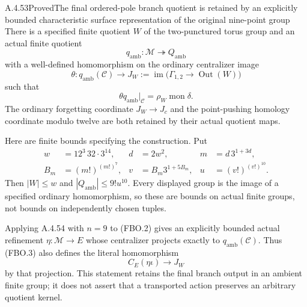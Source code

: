 \begin{result}{A.4.53}{Proved}{The final ordered-pole branch quotient is retained by an explicitly bounded characteristic surface representation of the original nine-point group}
There is a specified finite quotient $W$ of the two-punctured
torus group and an actual finite quotient
\[
 q_{\mathrm{amb}}:\mathcal M\twoheadrightarrow Q_{\mathrm{amb}}
                                                               \tag{FBO.2}
\]
with a well-defined homomorphism on the ordinary centralizer image
\[
 \theta:q_{\mathrm{amb}}(\mathcal C)
     \longrightarrow
     J_W:=\operatorname{im}\bigl(\Gamma_{1,2}
                            \to\operatorname{Out}(W)\bigr)
                                                               \tag{FBO.3}
\]
such that
\[
 \theta q_{\mathrm{amb}}|_{\mathcal C}
       =\rho_W\operatorname{mon}\delta.
                                                               \tag{FBO.4}
\]
The ordinary forgetting coordinate $J_W\to J_c$ and the
point-pushing homology coordinate modulo twelve are both
retained by their actual quotient maps.

Here are finite bounds specifying the construction.  Put
\[
 \begin{aligned}
 w&=12^3\,32\cdot3^{14},&d&=2w^2,&
 m&=d\,3^{1+3d},\\
 B_m&=(m!)^{(m!)^7},&
 v&=B_m3^{1+5B_m},&
 u&=(v!)^{(v!)^{10}}.
 \end{aligned}                                                   \tag{FBO.5}
\]
Then $|W|\leq w$ and $|Q_{\mathrm{amb}}|\leq9!u^{10}$.
Every displayed group is the image of a specified ordinary
homomorphism, so these are bounds on actual finite groups,
not bounds on independently chosen tuples.

Applying A.4.54 with $n=9$ to (FBO.2) gives an explicitly
bounded actual refinement $\eta:\mathcal M\to E$ whose
centralizer projects exactly to $q_{\mathrm{amb}}(\mathcal C)$.
Thus (FBO.3) also defines the literal homomorphism
\[
 C_E(\eta\iota)\longrightarrow J_W
                                                               \tag{FBO.6}
\]
by that projection.  This statement retains the final branch
output in an ambient finite group; it does not assert that a
transported action preserves an arbitrary quotient kernel.
\end{result}

